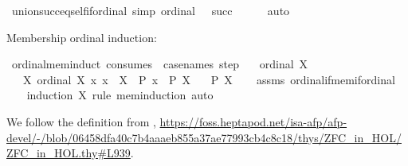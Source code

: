 \begin{isabellebody}
\isanewline
{}\isamarkupfalse%
\ union{\isacharunderscore}{\kern0pt}succ{\isacharunderscore}{\kern0pt}eq{\isacharunderscore}{\kern0pt}self{\isacharunderscore}{\kern0pt}if{\isacharunderscore}{\kern0pt}ordinal\ {\isacharbrackleft}{\kern0pt}simp{\isacharbrackright}{\kern0pt}{\isacharcolon}{\kern0pt}\ {\isachardoublequoteopen}ordinal\ {\isasymbeta}\ {\isasymLongrightarrow}\ {\isasymUnion}{\isacharparenleft}{\kern0pt}succ\ {\isasymbeta}{\isacharparenright}{\kern0pt}\ {\isacharequal}{\kern0pt}\ {\isasymbeta}{\isachardoublequoteclose}%
\isadelimproof
\ %
\endisadelimproof
%
\isatagproof
{}\isamarkupfalse%
\ auto%
\endisatagproof
{\isafoldproof}%
%
\isadelimproof
%
\endisadelimproof
%
\begin{isamarkuptext}%
Membership ordinal induction:%
\end{isamarkuptext}\isamarkuptrue%
\isamarkupfalse%
\ ordinal{\isacharunderscore}{\kern0pt}mem{\isacharunderscore}{\kern0pt}induct\ {\isacharbrackleft}{\kern0pt}consumes\ {}{\isacharcomma}{\kern0pt}\ case{\isacharunderscore}{\kern0pt}names\ step{\isacharbrackright}{\kern0pt}{\isacharcolon}{\kern0pt}\isanewline
\ \ \ {\isachardoublequoteopen}ordinal\ X{\isachardoublequoteclose}\isanewline
\ \ \ {\isachardoublequoteopen}{\isasymAnd}X{\isachardot}{\kern0pt}\ {\isasymlbrakk}ordinal\ X{\isacharsemicolon}{\kern0pt}\ {\isasymAnd}x{\isachardot}{\kern0pt}\ x\ {\isasymin}\ X\ {\isasymLongrightarrow}\ P\ x{\isasymrbrakk}\ {\isasymLongrightarrow}\ P\ X{\isachardoublequoteclose}\isanewline
\ \ \ {\isachardoublequoteopen}P\ X{\isachardoublequoteclose}\isanewline
%
\isadelimproof
\ \ %
\endisadelimproof
%
\isatagproof
{}\isamarkupfalse%
\ assms\ ordinal{\isacharunderscore}{\kern0pt}if{\isacharunderscore}{\kern0pt}mem{\isacharunderscore}{\kern0pt}if{\isacharunderscore}{\kern0pt}ordinal\isanewline
\ \ \isamarkupfalse%
\ {\isacharparenleft}{\kern0pt}induction\ X\ rule{\isacharcolon}{\kern0pt}\ mem{\isacharunderscore}{\kern0pt}induction{\isacharparenright}{\kern0pt}\ auto%
\endisatagproof
{\isafoldproof}%
%
\isadelimproof
%
\endisadelimproof
%
\isadelimdocument
%
\endisadelimdocument
%
\isatagdocument
%
\isamarkuptrue%
%
\endisatagdocument
{\isafolddocument}%
%
\isadelimdocument
%
\endisadelimdocument
%
\begin{isamarkuptext}%
We follow the definition from \cite{ZFC_in_HOL_AFP},
\url{https://foss.heptapod.net/isa-afp/afp-devel/-/blob/06458dfa40c7b4aaaeb855a37ae77993cb4c8c18/thys/ZFC_in_HOL/ZFC_in_HOL.thy\#L939}.

\end{isamarkuptext}
\end{isabellebody}
